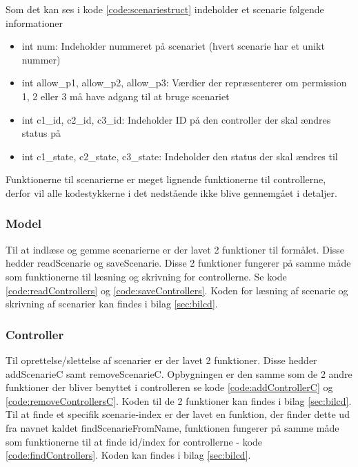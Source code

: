 
Som det kan ses i kode \ref{code:scenariestruct} indeholder et scenarie følgende informationer
\begin{itemize}
    \item int num: Indeholder nummeret på scenariet (hvert scenarie har et unikt nummer)
    \item int allow\_p1, allow\_p2, allow\_p3: Værdier der repræsenterer om permission 1, 2 eller 3 må have adgang til at bruge scenariet
    \item int c1\_id, c2\_id, c3\_id: Indeholder ID på den controller der skal ændres status på
    \item int c1\_state, c2\_state, c3\_state: Indeholder den status der skal ændres til
\end{itemize}

Funktionerne til scenarierne er meget lignende funktionerne til controllerne, derfor vil alle kodestykkerne i det nedstående ikke blive gennemgået i detaljer.

\subsubsection*{Model}
Til at indlæse og gemme scenarierne er der lavet 2 funktioner til formålet. Disse hedder readScenarie og saveScenarie. Disse 2 funktioner fungerer på samme måde som funktionerne til læsning og skrivning for controllerne. Se kode \ref{code:readControllers} og \ref{code:saveControllers}. Koden for læsning af scenarie og skrivning af scenarier kan findes i bilag \ref{sec:bilcd}.

\subsubsection*{Controller}
Til oprettelse/slettelse af scenarier er der lavet 2 funktioner. Disse hedder addScenarieC samt removeScenarieC. Opbygningen er den samme som de 2 andre funktioner der bliver benyttet i controlleren se kode \ref{code:addControllerC} og \ref{code:removeControllersC}. Koden til de 2 funktioner kan findes i bilag \ref{sec:bilcd}.\\

Til at finde et specifik scenarie-index er der lavet en funktion, der finder dette ud fra navnet kaldet findScenarieFromName, funktionen fungerer på samme måde som funktionerne til at finde id/index for controllerne - kode \ref{code:findControllers}. Koden kan findes i bilag \ref{sec:bilcd}.

